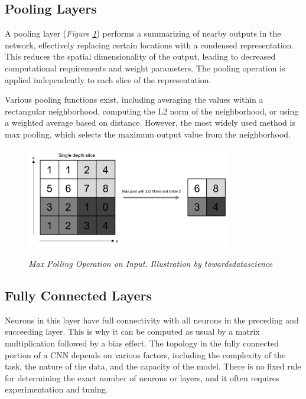 \newpage

\subsection{Pooling Layers}

A pooling layer (\textit{Figure \ref{fig:pooling-layer}}) performs a
summarizing of nearby outputs in the network, effectively replacing certain
locations with a condensed representation. This reduces the spatial
dimensionality of the output, leading to decreased computational requirements
and weight parameters. The pooling operation is applied independently to each
slice of the representation. \newline

Various pooling functions exist, including averaging the values within a
rectangular neighborhood, computing the L2 norm of the neighborhood, or using a
weighted average based on distance. However, the most widely used method is max
pooling, which selects the maximum output value from the neighborhood.

\begin{figure}[H]
  \centering
  \includegraphics[width=0.8\textwidth]{imatges/preliminaries/polling-layer.png}
  \caption[Max Polling Operation on Input]{\textit{Max Polling Operation on Input. Illustration by towardsdatascience}}
  {\label{fig:pooling-layer}}
\end{figure}

\subsection{Fully Connected Layers}

Neurons in this layer have full connectivity with all neurons in the preceding
and succeeding layer. This is why it can be computed as usual by a matrix
multiplication followed by a bias effect. The topology in the fully connected
portion of a CNN depends on various factors, including the complexity of the
task, the nature of the data, and the capacity of the model. There is no fixed
rule for determining the exact number of neurons or layers, and it often
requires experimentation and tuning. \newline

